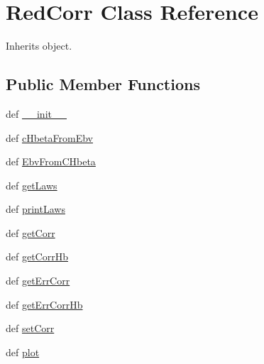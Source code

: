 \hypertarget{classpyneb_1_1extinction_1_1red__corr_1_1_red_corr}{\section{Red\-Corr Class Reference}
\label{classpyneb_1_1extinction_1_1red__corr_1_1_red_corr}
}


Inherits object.

\subsection*{Public Member Functions}
\begin{DoxyCompactItemize}
\item 
def \hyperlink{classpyneb_1_1extinction_1_1red__corr_1_1_red_corr_ac775ee34451fdfa742b318538164070e}{\-\_\-\-\_\-init\-\_\-\-\_\-}
\item 
def \hyperlink{classpyneb_1_1extinction_1_1red__corr_1_1_red_corr_aafa520130a64223ee6148a2b962f1102}{c\-Hbeta\-From\-Ebv}
\item 
def \hyperlink{classpyneb_1_1extinction_1_1red__corr_1_1_red_corr_afc105da13b3a4263674b36acfa592146}{Ebv\-From\-C\-Hbeta}
\item 
def \hyperlink{classpyneb_1_1extinction_1_1red__corr_1_1_red_corr_ad24822a5e1e3257e0598c76b7f970849}{get\-Laws}
\item 
def \hyperlink{classpyneb_1_1extinction_1_1red__corr_1_1_red_corr_afd2e91c10fd7001121609ff74736d1ac}{print\-Laws}
\item 
def \hyperlink{classpyneb_1_1extinction_1_1red__corr_1_1_red_corr_a7f55de02f3ebbced0e315afb1799861f}{get\-Corr}
\item 
def \hyperlink{classpyneb_1_1extinction_1_1red__corr_1_1_red_corr_acd70bdb442646398a2c5c77cc796eb04}{get\-Corr\-Hb}
\item 
def \hyperlink{classpyneb_1_1extinction_1_1red__corr_1_1_red_corr_a2d72a98f06c1bf76aa68aa633e0b1495}{get\-Err\-Corr}
\item 
def \hyperlink{classpyneb_1_1extinction_1_1red__corr_1_1_red_corr_a78814e3997e4a002ba4415efa76c991d}{get\-Err\-Corr\-Hb}
\item 
def \hyperlink{classpyneb_1_1extinction_1_1red__corr_1_1_red_corr_a65baef22ba95e7a0759cf87ad5b25d63}{set\-Corr}
\item 
def \hyperlink{classpyneb_1_1extinction_1_1red__corr_1_1_red_corr_ab0394ec3bced7aafedc829f80d3d95f5}{plot}
\end{DoxyCompactItemize}
